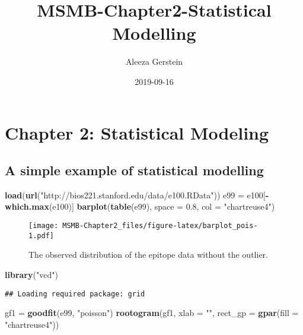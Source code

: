 \documentclass[]{article}
\title{MSMB-Chapter2-Statistical Modelling}
\author{Aleeza Gerstein}
\date{2019-09-16}
\newenvironment{Shaded}{\begin{snugshade}}{\end{snugshade}}
\newcommand{\KeywordTok}[1]{\textcolor[rgb]{0.13,0.29,0.53}{\textbf{#1}}}
\newcommand{\DataTypeTok}[1]{\textcolor[rgb]{0.13,0.29,0.53}{#1}}
\newcommand{\FloatTok}[1]{\textcolor[rgb]{0.00,0.00,0.81}{#1}}
\newcommand{\StringTok}[1]{\textcolor[rgb]{0.31,0.60,0.02}{#1}}
\newcommand{\OperatorTok}[1]{\textcolor[rgb]{0.81,0.36,0.00}{\textbf{#1}}}
\newcommand{\NormalTok}[1]{#1}
\begin{document}
\maketitle

\section{Chapter 2: Statistical
Modeling}\label{chapter-2-statistical-modeling}

\subsection{A simple example of statistical
modelling}\label{a-simple-example-of-statistical-modelling}

\begin{Shaded}
\begin{Highlighting}[]
\KeywordTok{load}\NormalTok{(}\KeywordTok{url}\NormalTok{(}\StringTok{"http://bios221.stanford.edu/data/e100.RData"}\NormalTok{))}
\NormalTok{e99 =}\StringTok{ }\NormalTok{e100[}\OperatorTok{-}\KeywordTok{which.max}\NormalTok{(e100)]}
\KeywordTok{barplot}\NormalTok{(}\KeywordTok{table}\NormalTok{(e99), }\DataTypeTok{space =} \FloatTok{0.8}\NormalTok{, }\DataTypeTok{col =} \StringTok{"chartreuse4"}\NormalTok{)}
\end{Highlighting}
\end{Shaded}

\begin{figure}
\centering
\texttt{[image: MSMB-Chapter2\_files/figure-latex/barplot\_pois-1.pdf]}
\caption{The observed distribution of the epitope data without the
outlier.}
\end{figure}

\begin{Shaded}
\begin{Highlighting}[]
\KeywordTok{library}\NormalTok{(}\StringTok{"vcd"}\NormalTok{)}
\end{Highlighting}
\end{Shaded}

\begin{verbatim}
## Loading required package: grid
\end{verbatim}

\begin{Shaded}
\begin{Highlighting}[]
\NormalTok{gf1 =}\StringTok{ }\KeywordTok{goodfit}\NormalTok{(e99, }\StringTok{"poisson"}\NormalTok{)}
\KeywordTok{rootogram}\NormalTok{(gf1, }\DataTypeTok{xlab =} \StringTok{""}\NormalTok{, }\DataTypeTok{rect_gp =} \KeywordTok{gpar}\NormalTok{(}\DataTypeTok{fill =} \StringTok{"chartreuse4"}\NormalTok{))}
\end{Highlighting}
\end{Shaded}
\end{document}

